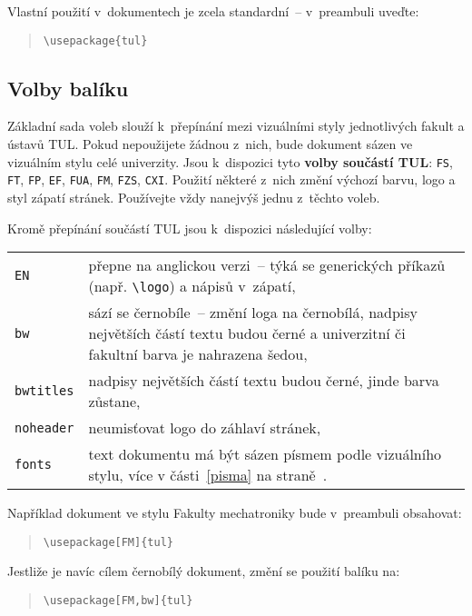 \documentclass[a4paper,12pt,twoside]{article}
\makeatletter
\newcommand{\cmdfont}[1]{\texttt{\color{\tulcolor}#1}}
\newcommand{\cmdnoindex}[1]{\cmdfont{\textbackslash #1}}
\newcommand{\cmd}[1]{\cmdnoindex{#1}\index{#1@\textbackslash #1}}
\makeatother
\begin{document}
Vlastní použití v~dokumentech je zcela standardní~-- v~preambuli uveďte:

\begin{quote}
\cmdnoindex{usepackage\{tul\}}
\end{quote}


\subsection*{Volby balíku}

Základní sada voleb slouží k~přepínání mezi vizuálními styly jednotlivých
fakult a ústavů TUL. Pokud nepoužijete žádnou z~nich, bude dokument sázen ve
vizuálním stylu celé univerzity. Jsou k~dispozici tyto \textbf{volby součástí
TUL}: \cmdfont{FS}, \cmdfont{FT}, \cmdfont{FP}, \cmdfont{EF}, \cmdfont{FUA},
\cmdfont{FM}, \cmdfont{FZS}, \cmdfont{CXI}. Použití některé z~nich změní
výchozí barvu, logo a styl zápatí stránek. Používejte vždy nanejvýš jednu
z~těchto voleb.

Kromě přepínání součástí TUL jsou k~dispozici následující volby:

\medskip

\begin{tabularx}{\textwidth}{@{}lX}
\cmdfont{EN} & přepne na anglickou verzi~-- týká se generických příkazů
(např. \cmd{logo}) a nápisů v~zápatí,\\
\cmdfont{bw} & sází se černobíle~-- změní loga na černobílá, nadpisy největších
částí textu budou černé a univerzitní či fakultní barva je nahrazena šedou,\\
\cmdfont{bwtitles} & nadpisy největších částí textu budou černé, jinde barva
zůstane,\\
\cmdfont{noheader} & neumisťovat logo do záhlaví stránek,\\
\cmdfont{fonts} & text dokumentu má být sázen písmem podle vizuálního stylu,
více v části~\ref{pisma} na straně~\pageref{pisma}.
\end{tabularx}

\medskip

Například dokument ve stylu Fakulty mechatroniky bude v~preambuli obsahovat:

\begin{quote}
\cmdnoindex{usepackage[FM]\{tul\}}
\end{quote}

Jestliže je navíc cílem černobílý dokument, změní se použití balíku na:

\begin{quote}
\cmdnoindex{usepackage[FM,bw]\{tul\}}
\end{quote}
\end{document}
